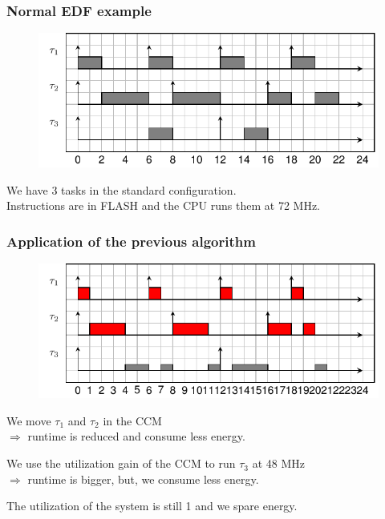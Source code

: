 \documentclass[
	11pt, %
]{beamer}
\begin{document}
\begin{frame}[fragile]
	\frametitle{ Normal EDF example }
	\begin{figure}
		\includegraphics{schedule/edf.pdf}
	\end{figure}
	We have 3 tasks in the standard configuration. \\
	Instructions are in FLASH and the CPU runs them at 72 MHz.
\end{frame}


\begin{frame}[fragile]
	\frametitle{ Application of the previous algorithm }
	\begin{figure}
		\includegraphics{schedule/offline_algo.pdf}
	\end{figure}
	We move $\tau_1$ and $\tau_2$ in the CCM 
	\\ $\Rightarrow$ runtime is reduced and consume less energy.\newline

	We use the utilization gain of the CCM to run $\tau_3$ at 48 MHz 
	\\$\Rightarrow$ runtime is bigger, but, we consume less energy. \newline

	The utilization of the system is still 1 and we spare energy.
\end{frame}
\end{document}
